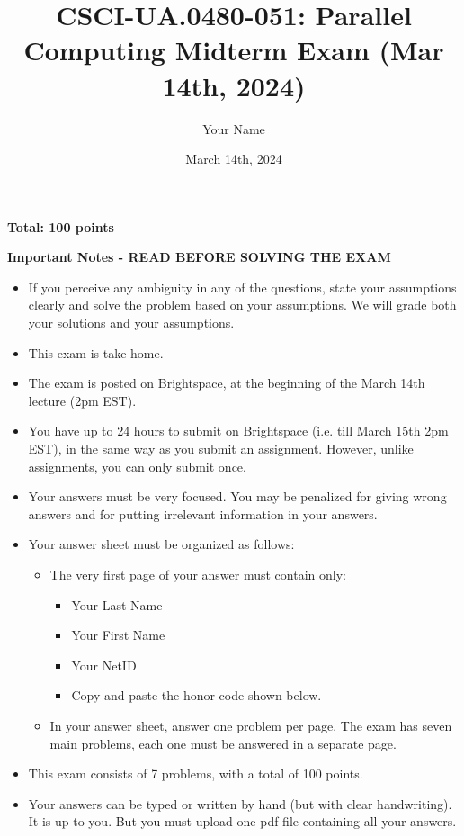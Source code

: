 \documentclass{article}
\title{CSCI-UA.0480-051: Parallel Computing Midterm Exam (Mar 14th, 2024)}
\author{Your Name}
\date{March 14th, 2024}
\begin{document}
\maketitle

\textbf{Total: 100 points}

\textbf{Important Notes - READ BEFORE SOLVING THE EXAM}

\begin{itemize}
    \item If you perceive any ambiguity in any of the questions, state your assumptions clearly and solve the problem based on your assumptions. We will grade both your solutions and your assumptions.
    \item This exam is take-home.
    \item The exam is posted on Brightspace, at the beginning of the March 14th lecture (2pm EST).
    \item You have up to 24 hours to submit on Brightspace (i.e. till March 15th 2pm EST), in the same way as you submit an assignment. However, unlike assignments, you can only submit once.
    \item Your answers must be very focused. You may be penalized for giving wrong answers and for putting irrelevant information in your answers.
    \item Your answer sheet must be organized as follows:
    \begin{itemize}
        \item The very first page of your answer must contain only:
        \begin{itemize}
            \item Your Last Name
            \item Your First Name
            \item Your NetID
            \item Copy and paste the honor code shown below.
        \end{itemize}
        \item In your answer sheet, answer one problem per page. The exam has seven main problems, each one must be answered in a separate page.
    \end{itemize}
    \item This exam consists of 7 problems, with a total of 100 points.
    \item Your answers can be typed or written by hand (but with clear handwriting). It is up to you. But you must upload one pdf file containing all your answers.
\end{itemize}
\end{document}
